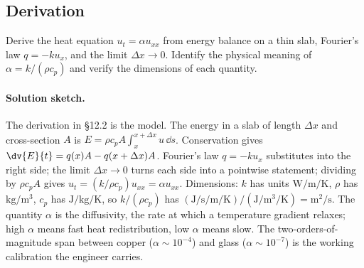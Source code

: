 \subsection*{Derivation}

\begin{exercise}
Derive the heat equation $u_{t} = \alpha u_{xx}$ from energy
balance on a thin slab, Fourier's law $q = -k u_{x}$, and the
limit $\Delta x \to 0$. Identify the physical meaning of $\alpha
= k/(\rho c_{p})$ and verify the dimensions of each quantity.

\paragraph{Solution sketch.}
The derivation in §12.2 is the model. The energy in a slab of
length $\Delta x$ and cross-section $A$ is $E = \rho c_{p} A
\int_{x}^{x + \Delta x} u\, \dd s$. Conservation gives $\dv{E}{t}
= q(x) A - q(x + \Delta x) A$. Fourier's law $q = -k u_{x}$
substitutes into the right side; the limit $\Delta x \to 0$ turns
each side into a pointwise statement; dividing by $\rho c_{p} A$
gives $u_{t} = (k/\rho c_{p}) u_{xx} = \alpha u_{xx}$. Dimensions:
$k$ has units $\si{\watt\per\meter\per\kelvin}$, $\rho$ has
$\si{\kilogram\per\meter\cubed}$, $c_{p}$ has $\si{\joule\per
\kilogram\per\kelvin}$, so $k/(\rho c_{p})$ has $(\si{\joule\per
\second\per\meter\per\kelvin})/(\si{\joule\per\meter\cubed\per
\kelvin}) = \si{\meter\squared\per\second}$. The quantity
$\alpha$ is the diffusivity, the rate at which a temperature
gradient relaxes; high $\alpha$ means fast heat redistribution,
low $\alpha$ means slow. The two-orders-of-magnitude span between
copper ($\alpha \sim 10^{-4}$) and glass ($\alpha \sim 10^{-7}$)
is the working calibration the engineer carries.
\end{exercise}

